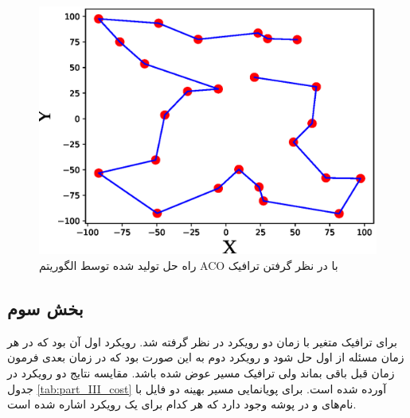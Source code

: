 \begin{figure}[H]
	\caption{راه حل تولید شده توسط الگوریتم ACO با در نظر گرفتن ترافیک} 
	\centering 
	\includegraphics[width=16cm]{../Figure/Q2/ACO_traffic_solution} 
\end{figure}

\subsection{بخش سوم}\label{sec:part_III}
برای ترافیک متغیر با زمان دو رویکرد در نظر گرفته شد. رویکرد اول آن بود که در هر زمان مسئله از اول حل شود و رویکرد دوم به این صورت بود که در زمان بعدی فرمون زمان قبل باقی بماند ولی ترافیک مسیر عوض شده باشد. مقایسه نتایج دو رویکرد در جدول
\ref{tab:part_III_cost}
آورده شده است. برای پویانمایی مسیر بهینه دو فایل
با نام‌های
و
در پوشه 
وجود دارد که هر کدام برای یک رویکرد اشاره شده است.




